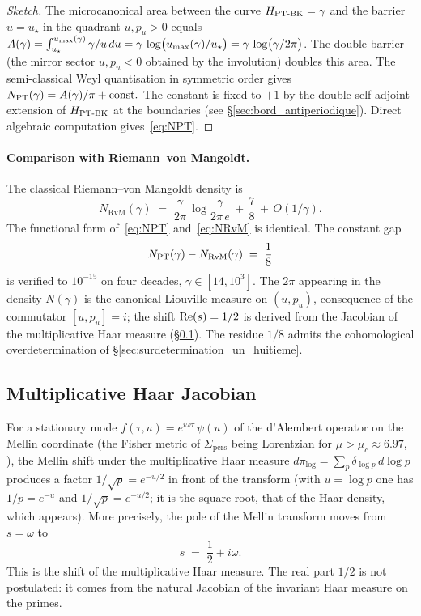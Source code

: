 \begin{proof}[Sketch]
The microcanonical area between the curve $H_{\mathrm{PT\text{-}BK}} = \gamma$ and the
barrier $u = u_\star$ in the quadrant $u, p_u > 0$ equals
$A(\gamma) = \int_{u_\star}^{u_{\max}(\gamma)} \gamma/u\,du
= \gamma\,\log\!\big(u_{\max}(\gamma)/u_\star\big)
= \gamma\,\log\!\big(\gamma/2\pi\big)$.
The double barrier (the mirror sector $u, p_u < 0$ obtained by the
involution) doubles this area. The semi-classical Weyl quantisation in
symmetric order gives $N_{\mathrm{PT}}(\gamma) = A(\gamma)/\pi + \text{const.}$ The
constant is fixed to $+1$ by the double self-adjoint extension
of $H_{\mathrm{PT\text{-}BK}}$ at the boundaries (see \S\ref{sec:bord_antiperiodique}).
Direct algebraic computation gives~\eqref{eq:NPT}.
\end{proof}

\paragraph{Comparison with Riemann--von Mangoldt.}
The classical Riemann--von Mangoldt density \cite{Edwards1974} is
\begin{equation}
N_{\mathrm{RvM}}(\gamma) \;=\; \dfrac{\gamma}{2\pi}\,\log\dfrac{\gamma}{2\pi\,e} \,+\, \dfrac{7}{8} \,+\, O(1/\gamma).
\label{eq:NRvM}
\end{equation}
The functional form of~\eqref{eq:NPT} and~\eqref{eq:NRvM} is
identical. The constant gap
\begin{equation}
N_{\mathrm{PT}}(\gamma) - N_{\mathrm{RvM}}(\gamma) \;=\; \dfrac{1}{8}
\label{eq:residu_un_huitieme}
\end{equation}
is verified to $10^{-15}$ on four decades, $\gamma \in [14, 10^{3}]$.
The $2\pi$ appearing in the density $N(\gamma)$ is the canonical
Liouville measure on $(u, p_u)$, consequence of the commutator
$[u, p_u] = i$; the shift $\operatorname{Re}(s) = 1/2$ is derived from the Jacobian
of the multiplicative Haar measure (\S\ref{sec:haar_jacobien}). The residue
$1/8$ admits the cohomological overdetermination of
\S\ref{sec:surdetermination_un_huitieme}.

\subsection{Multiplicative Haar Jacobian}
\label{sec:haar_jacobien}

For a stationary mode $f(\tau, u) = e^{i\omega\tau}\,\psi(u)$ of
the d'Alembert operator on the Mellin coordinate (the Fisher metric
of $\Sigma_{\mathrm{pers}}$ being Lorentzian for
$\mu > \mu_c \approx 6.97$, \cite{PT_GeoSpectral}), the Mellin shift
under the multiplicative Haar measure
$d\pi_{\log} = \sum_p \delta_{\log p}\,d\log p$ produces a factor
$1/\sqrt{p} = e^{-u/2}$ in front of the transform (with $u = \log p$ one
has $1/p = e^{-u}$ and $1/\sqrt{p} = e^{-u/2}$; it is the square root,
that of the Haar density, which appears). More precisely, the pole of
the Mellin transform moves from $s = \omega$ to
\begin{equation}
\boxed{\;s \;=\; \dfrac{1}{2} + i\omega.\;}
\label{eq:haar_shift}
\end{equation}
This is the shift of the multiplicative Haar measure. The real part
$1/2$ is not postulated: it comes from the natural Jacobian of the
invariant Haar measure on the primes.

